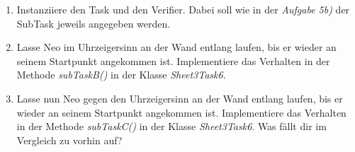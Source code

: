 
\begin{enumerate}[label=\alph*)]
    \item Instanziiere den Task und den Verifier. Dabei soll wie in der \textit{Aufgabe 5b)} der SubTask jeweils angegeben werden.
    \item Lasse Neo im Uhrzeigersinn an der Wand entlang laufen, bis er wieder an seinem Startpunkt angekommen ist.
    Implementiere das Verhalten in der Methode \textit{subTaskB()} in der Klasse \textit{Sheet3Task6}.
    \item Lasse nun Neo gegen den Uhrzeigersinn an der Wand entlang laufen, bis er wieder an seinem Startpunkt angekommen ist.
    Implementiere das Verhalten in der Methode \textit{subTaskC()} in der Klasse \textit{Sheet3Task6}.
    Was fällt dir im Vergleich zu vorhin auf?
\end{enumerate}
